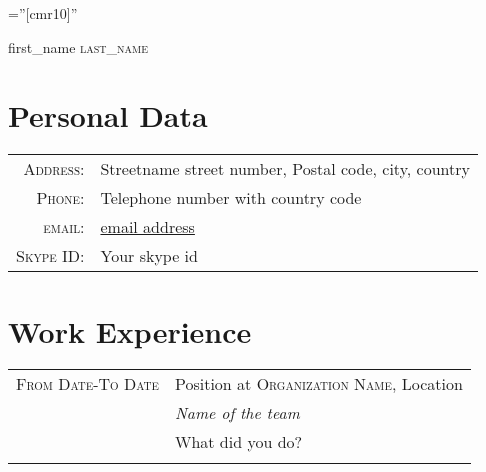 



\pagestyle{empty} %

\font\fb=''[cmr10]'' %

\par{\centering
		{\Huge first_name \textsc{last_name}
	}\bigskip\par}

\section{Personal Data}

\begin{tabular}{rl}
    \textsc{Address:}   & Streetname street number, Postal code, city, country \\
    \textsc{Phone:}     & Telephone number with country code\\
    \textsc{email:}     & \href{mailto:email address}{email address}\\
    \textsc{Skype ID:}     & Your skype id\\
\end{tabular}

\section{Work Experience}
\begin{tabular}{r|p{11cm}}
 \textsc{From Date-To Date} & Position at \textsc{Organization Name}, Location \\&\emph{Name of the team}\\&\footnotesize{What did you do?}\\\multicolumn{2}{c}{} \\
 
\end{tabular}


